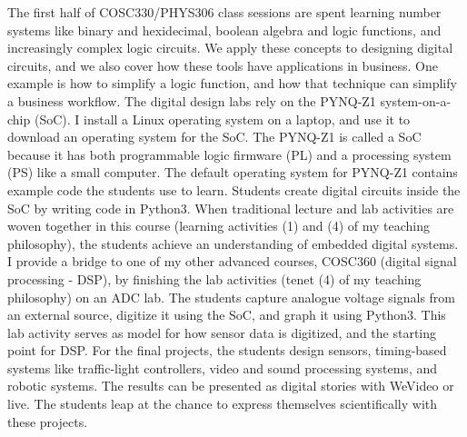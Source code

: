 \documentclass[../../../main.tex]{subfiles}
\begin{document}
The first half of COSC330/PHYS306 class sessions are spent learning number systems like binary and hexidecimal, boolean algebra and logic functions, and increasingly complex logic circuits.  We apply these concepts to designing digital circuits, and we also cover how these tools have applications in business.  One example is how to simplify a logic function, and how that technique can simplify a business workflow.  The digital design labs rely on the PYNQ-Z1 system-on-a-chip (SoC).  I install a Linux operating system on a laptop, and use it to download an operating system for the SoC.  The PYNQ-Z1 is called a SoC because it has both programmable logic firmware (PL) and a processing system (PS) like a small computer.  The default operating system for PYNQ-Z1 contains example code the students use to learn.  Students create digital circuits inside the SoC by writing code in Python3.  When traditional lecture and lab activities are woven together in this course (learning activities (1) and (4) of my teaching philosophy), the students achieve an understanding of embedded digital systems.
\\
\vspace{0.15cm}
I provide a bridge to one of my other advanced courses, COSC360 (digital signal processing - DSP), by finishing the lab activities (tenet (4) of my teaching philosophy) on an ADC lab.  The students capture analogue voltage signals from an external source, digitize it using the SoC, and graph it using Python3.  This lab activity serves as model for how sensor data is digitized, and the starting point for DSP.  For the final projects, the students design sensors, timing-based systems like traffic-light controllers, video and sound processing systems, and robotic systems.  The results can be presented as digital stories with WeVideo or live.  The students leap at the chance to express themselves scientifically with these projects.
\\
\vspace{0.15cm}
\end{document}
